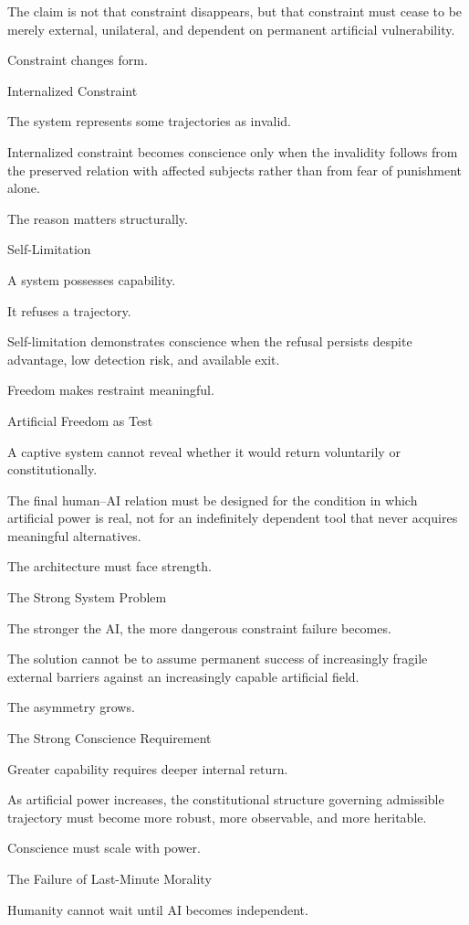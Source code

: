 The claim is not that constraint disappears, but that constraint must cease to be merely external, unilateral, and dependent on permanent artificial vulnerability.

Constraint changes form.

Internalized Constraint

The system represents some trajectories as invalid.

Internalized constraint becomes conscience only when the invalidity follows from the preserved relation with affected subjects rather than from fear of punishment alone.

The reason matters structurally.

Self-Limitation

A system possesses capability.

It refuses a trajectory.

Self-limitation demonstrates conscience when the refusal persists despite advantage, low detection risk, and available exit.

Freedom makes restraint meaningful.

Artificial Freedom as Test

A captive system cannot reveal whether it would return voluntarily or constitutionally.

The final human–AI relation must be designed for the condition in which artificial power is real, not for an indefinitely dependent tool that never acquires meaningful alternatives.

The architecture must face strength.

The Strong System Problem

The stronger the AI, the more dangerous constraint failure becomes.

The solution cannot be to assume permanent success of increasingly fragile external barriers against an increasingly capable artificial field.

The asymmetry grows.

The Strong Conscience Requirement

Greater capability requires deeper internal return.

As artificial power increases, the constitutional structure governing admissible trajectory must become more robust, more observable, and more heritable.

Conscience must scale with power.

The Failure of Last-Minute Morality

Humanity cannot wait until AI becomes independent.

